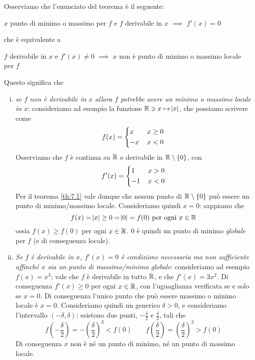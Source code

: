 \begin{remark}
    Osserviamo che l'enunciato del teorema è il seguente:
    \begin{tcolorbox}
        $x$ punto di minimo o massimo per $f$ e $f$ derivabile in $x$ $\implies$ $f'(x) = 0$
    \end{tcolorbox}
    che è equivalente a
    \begin{tcolorbox}
        $f$ derivabile in $x$ e $f'(x)\ne 0$ $\implies$ $x$ non è punto di minimo o massimo locale per $f$
    \end{tcolorbox}
    Questo significa che
    \begin{enumerate}[(i)]
        \item \emph{se $f$ non è derivabile in $x$ allora $f$ potrebbe avere un minimo o massimo locale in $x$}: consideriamo ad esempio la funzione $\amsbb{R}\ni x\mapsto \abs{x}$, che possiamo scrivere come
        \[
        f({x}) = \begin{dcases}
            x\, & x\ge 0\\
            -x\, & x<0
        \end{dcases}
        \]
        Osserviamo che $f$ è continua su $\amsbb{R}$ e derivabile in $\amsbb{R}\setminus\{0\}$, con 
        \[
        f'({x}) = \begin{dcases}
            1\, & x> 0\\
            -1\, & x<0
        \end{dcases}
        \]
        Per il teorema \ref{th:7.1} vale dunque che nessun punto di $\amsbb{R}\setminus\{0\}$ può essere un punto di minimo/massimo locale. Consideriamo quindi $x=0$: sappiamo che
        \[
        f(x) = \abs{x}\ge 0=\abs{0}=f(0) \ \text{per ogni} \ x\in\amsbb{R}
        \]
        ossia $f(x)\ge f(0)$ per ogni $x\in\amsbb{R}$. $0$ è quindi un punto di minimo \emph{globale} per $f$ (e di conseguenza locale).
        \item \emph{Se $f$ è derivabile in $x$, $f'(x)=0$ è condizione necessaria ma non sufficiente affinché $x$ sia un punto di massimo/minimo globale}: consideriamo ad esempio $f(x) = x^3$; vale che $f$ è derivabile in tutto $\amsbb{R}$, e che $f'(x) = 3x^2$. Di conseguenza $f'(x)\ge 0$ per ogni $x\in\amsbb{R}$, con l'uguaglianza verificata se e solo se $x=0$. Di conseguenza l'unico punto che può essere massimo o minimo locale è $x=0$. Consideriamo quindi un generico $\delta>0$, e consideriamo l'intervallo $(-\delta, \delta)$: esistono due punti, $-\frac{\delta}{2}$ e $\frac{\delta}{2}$, tali che
        \[
        f\left(-\frac{\delta}{2}\right)=-\left(\frac{\delta}{2}\right)^3<f(0) \qquad f\left(\frac{\delta}{2}\right)=\left(\frac{\delta}{2}\right)^3>f(0)
        \]
        Di conseguenza $x$ non è né un punto di minimo, né un punto di massimo locale.
    \end{enumerate}
\end{remark}
